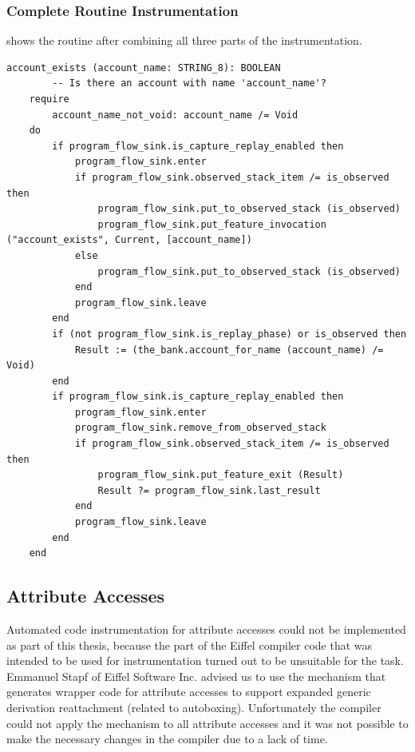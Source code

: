 \subsubsection{Complete Routine Instrumentation}
 shows the routine after combining all three parts of the instrumentation.
\begin{lstlisting}[caption=Routine \texttt{account\_exists} After Instrumentation,label=lst:account_exists_instrumented]
account_exists (account_name: STRING_8): BOOLEAN
		-- Is there an account with name 'account_name'?
	require
		account_name_not_void: account_name /= Void
	do
		if program_flow_sink.is_capture_replay_enabled then
			program_flow_sink.enter
			if program_flow_sink.observed_stack_item /= is_observed then
				program_flow_sink.put_to_observed_stack (is_observed)
				program_flow_sink.put_feature_invocation ("account_exists", Current, [account_name])
			else
				program_flow_sink.put_to_observed_stack (is_observed)
			end
			program_flow_sink.leave
		end
		if (not program_flow_sink.is_replay_phase) or is_observed then
			Result := (the_bank.account_for_name (account_name) /= Void)
		end
		if program_flow_sink.is_capture_replay_enabled then
			program_flow_sink.enter
			program_flow_sink.remove_from_observed_stack
			if program_flow_sink.observed_stack_item /= is_observed then
				program_flow_sink.put_feature_exit (Result)
				Result ?= program_flow_sink.last_result
			end
			program_flow_sink.leave
		end
	end
\end{lstlisting}

\subsection{Attribute Accesses}
Automated code instrumentation for attribute accesses could not be implemented as part of this thesis, because the part of the Eiffel compiler code that was intended to be used for instrumentation turned out to be unsuitable for the task. Emmanuel Stapf of Eiffel Software Inc. advised us to use the mechanism that generates wrapper code for attribute accesses to support expanded generic derivation reattachment (related to autoboxing). Unfortunately the compiler could not apply the mechanism to all attribute accesses and it was not possible to make the necessary changes in the compiler due to a lack of time.

